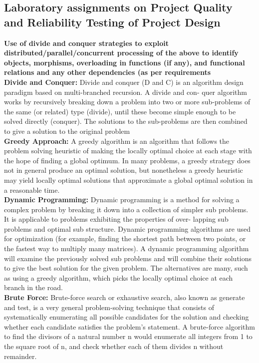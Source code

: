\documentclass[oneside,a4paper,12pt]{report}
\begin{document}
{\begin{appendices}
\chapter{Laboratory assignments on Project Quality and Reliability Testing of Project Design}
\noindent \textbf{ Use of divide and conquer strategies to exploit distributed/parallel/concurrent processing of the  above  to identify objects, morphisms, overloading in functions (if any), and functional relations and any other  dependencies (as per requirements} \\ 

\noindent \textbf{ Divide and Conquer:} Divide and conquer (D and C) is an algorithm design paradigm based on multi-branched recursion. A divide and con- quer algorithm works by recursively breaking down a problem into two or more sub-problems of the same (or related) type (divide), until these become simple enough to be solved directly (conquer). The solutions to the sub-problems are then combined to give a solution to the original problem \\

\noindent \textbf{ Greedy Approach: } A greedy algorithm is an algorithm that follows the problem solving heuristic of making the locally optimal choice at each stage with the hope of ﬁnding a global optimum. In many problems, a greedy strategy does not in general produce an optimal solution, but nonetheless a greedy heuristic may yield locally optimal solutions that approximate a global optimal solution in a reasonable time. \\

\noindent \textbf{ Dynamic Programming: } Dynamic programming is a method for solving a complex problem by breaking it down into a collection of simpler sub problems. It is applicable to problems exhibiting the properties of over- lapping sub problems and optimal sub structure. Dynamic programming algorithms are used for optimization (for example, ﬁnding the shortest path between two points, or the fastest way to multiply many matrices). A dynamic programming algorithm will examine the previously solved sub problems and will combine their solutions to give the best solution for the given problem. The alternatives are many, such as using a greedy algorithm, which picks the locally optimal choice at each branch in the road. \\

\noindent \textbf{ Brute Force: } Brute-force search or exhaustive search, also known as generate and test, is a very general problem-solving technique that consists of systematically enumerating all possible candidates for the solution and checking whether each candidate satisﬁes the problem’s statement. A brute-force algorithm to ﬁnd the divisors of a natural number n would enumerate all integers from 1 to the square root of n, and check whether each of them divides n without remainder. \\


\end{appendices}}
\end{document}
